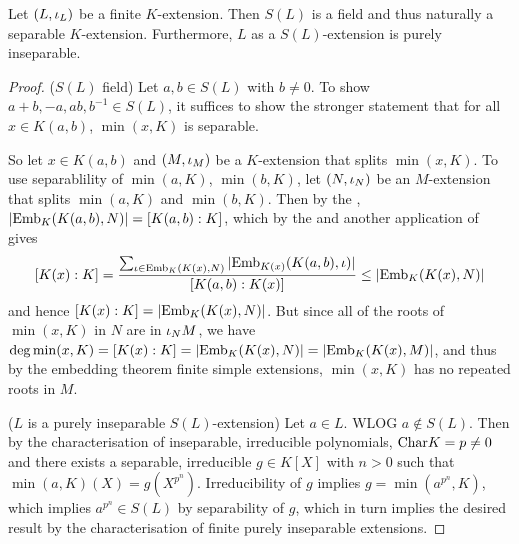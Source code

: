 \documentclass[main.tex]{subfiles}
\begin{document}
\begin{thm} 
  
  Let $(L,\iota_L)$ be a finite $K$-extension. 
  Then $S(L)$ is a field and thus naturally a separable $K$-extension. 
  Furthermore, $L$ as a $S(L)$-extension is purely inseparable. 
\end{thm}
\begin{proof}
  ($S(L)$ field) Let $a, b \in S(L)$ with $b \neq 0$. 
  To show $a + b, -a, a b, b^{-1} \in S(L)$,
  it suffices to show the stronger statement that 
  for all $x \in K(a,b)$, $\min(x,K)$ is separable.
  
  So let $x \in K(a,b)$ and 
  $(M,\iota_M)$ be a $K$-extension that splits $\min(x,K)$. 
  To use separablility of $\min(a,K)$, $\min(b,K)$, 
  let $(N,\iota_N)$ be an $M$-extension that splits $\min(a,K)$ and $\min(b,K)$.
  Then by the , 
  $|\mathrm{Emb}_{K}(K(a,b), N)| = [K(a,b) : K]$,
  which by the  and 
  another application of  gives \[
    [K(x) : K]
    = \frac{\sum_{\iota \in \mathrm{Emb}_{K}(K(x), N)} |\mathrm{Emb}_{K(x)}(K(a,b), \iota)|}
      {[K(a,b) : K(x)]}
    \leq |\mathrm{Emb}_{K}(K(x), N)|
  \]
  and hence $[K(x) : K] = |\mathrm{Emb}_{K}(K(x), N)|$.
  But since all of the roots of $\min(x,K)$ in $N$ are in $\iota_N M$,
  we have $\deg \min(x,K) = [K(x) : K] 
  = |\mathrm{Emb}_{K}(K(x), N)| = |\mathrm{Emb}_{K}(K(x), M)|$,
  and thus by the 
  {embedding theorem finite simple extensions}, 
  $\min(x,K)$ has no repeated roots in $M$. 

  ($L$ is a purely inseparable $S(L)$-extension)
  Let $a \in L$. WLOG $a \notin S(L)$. 
  Then by the 
  {characterisation of inseparable, irreducible polynomials}, 
  $\mathrm{Char}K = p \neq 0$ and there exists 
  a separable, irreducible $g \in K[X]$ with $n > 0$ such that 
  $\min(a,K)(X) = g(X^{p^n})$. 
  Irreducibility of $g$ implies $g = \min(a^{p^n},K)$,
  which implies $a^{p^n} \in S(L)$ by separability of $g$,
  which in turn implies the desired result by 
  the 
  {characterisation of finite purely inseparable extensions}. 
\end{proof}
\end{document}
